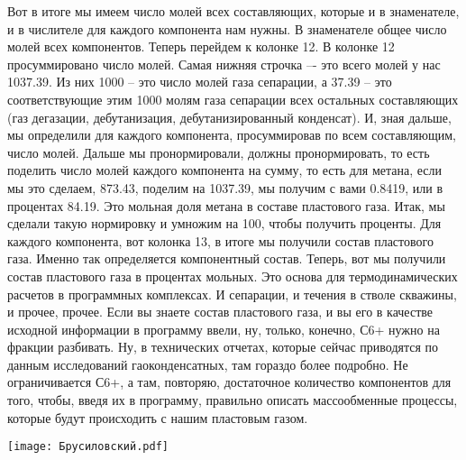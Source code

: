 \documentclass[main.tex]{subfiles}
\begin{document}
Вот в итоге мы имеем число молей всех составляющих, которые и в знаменателе, и в числителе для каждого компонента нам нужны.
В знаменателе общее число молей всех компонентов.
Теперь перейдем к колонке 12.
В колонке 12 просуммировано число молей.
Самая нижняя строчка –- это всего молей у нас 1037.39.
Из них 1000 – это число молей газа сепарации, а 37.39 – это соответствующие этим 1000 молям газа сепарации всех остальных составляющих (газ дегазации, дебутанизация, дебутанизированный конденсат).
И, зная дальше, мы определили для каждого компонента, просуммировав по всем составляющим, число молей.
Дальше мы пронормировали, должны пронормировать, то есть поделить число молей каждого компонента на сумму, то есть для метана, если мы это сделаем, 873.43, поделим на 1037.39, мы получим с вами 0.8419, или в процентах 84.19.
Это мольная доля метана в составе пластового газа.
Итак, мы сделали такую нормировку и умножим на 100, чтобы получить проценты.
Для каждого компонента, вот колонка 13, в итоге мы получили состав пластового газа.
Именно так определяется компонентный состав.
Теперь, вот мы получили состав пластового газа в процентах мольных.
Это основа для термодинамических расчетов в программных комплексах.
И сепарации, и течения в стволе скважины, и прочее, прочее.
Если вы знаете состав пластового газа, и вы его в качестве исходной информации в программу ввели, ну, только, конечно, С6+ нужно на фракции разбивать.
Ну, в технических отчетах, которые сейчас приводятся по данным исследований гаоконденсатных, там гораздо более подробно.
Не ограничивается С6+, а там, повторяю, достаточное количество компонентов для того, чтобы, введя их в программу, правильно описать массообменные процессы, которые будут происходить с нашим пластовым газом.

\begin{center}
\texttt{[image: Брусиловский.pdf]}
\end{center}
\end{document}
